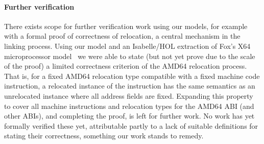 \documentclass[preprint,10pt]{sigplanconf-pldi16}
\begin{document}
\paragraph{Further verification}
There exists scope for further verification work using our models, for example with a formal proof of correctness of relocation, a central mechanism in the linking process.
Using our model and an Isabelle/HOL extraction of Fox's X64 microprocessor model~\cite{DBLP:conf/itp/Fox15} we were able to state (but not yet prove due to the scale of the proof) a limited correctness criterion of the AMD64 relocation process.
That is, for a fixed AMD64 relocation type compatible with a fixed machine code instruction, a relocated instance of the instruction has the same semantics as an unrelocated instance where all address fields are fixed.
Expanding this property to cover all machine instructions and relocation types for the AMD64 ABI (and other ABIs), and completing the proof, is left for further work.
No work has yet formally verified these yet, attributable partly to a lack of suitable definitions for stating their correctness, something our work stands to remedy.

\newpage


\end{document}
